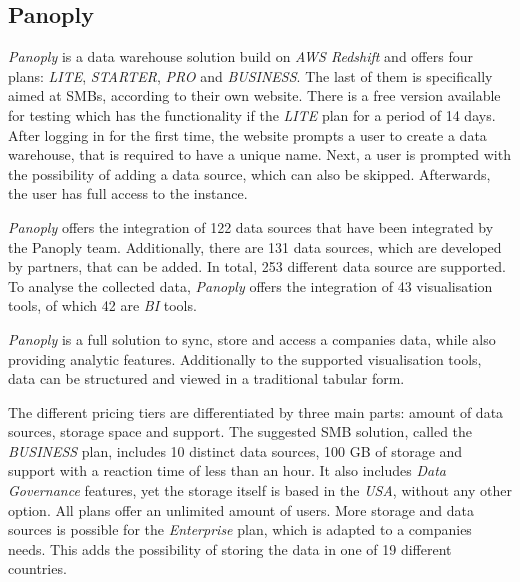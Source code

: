 \documentclass[../paper.tex]{subfiles}
\begin{document}
\subsection{Panoply}

\textit{Panoply} is a data warehouse solution build on \textit{AWS Redshift} and offers four plans: \textit{LITE}, \textit{STARTER}, \textit{PRO} and \textit{BUSINESS}. The last of them is specifically aimed at SMBs, according to their own website. There is a free version available for testing which has the functionality if the \textit{LITE} plan for a period of 14 days. After logging in for the first time, the website prompts a user to create a data warehouse, that is required to have a unique name. Next, a user is prompted with the possibility of adding a data source, which can also be skipped. Afterwards, the user has full access to the instance.

\textit{Panoply} offers the integration of 122 data sources that have been integrated by the Panoply team. Additionally, there are 131 data sources, which are developed by partners, that can be added. In total, 253 different data source are supported. To analyse the collected data, \textit{Panoply} offers the integration of 43 visualisation tools, of which 42 are \textit{BI} tools.

\textit{Panoply} is a full solution to sync, store and access a companies data, while also providing analytic features. Additionally to the supported visualisation tools, data can be structured and viewed in a traditional tabular form.

The different pricing tiers are differentiated by three main parts: amount of data sources, storage space and support. The suggested SMB solution, called the \textit{BUSINESS} plan, includes 10 distinct data sources, 100 GB of storage and support with a reaction time of less than an hour. It also includes \textit{Data Governance} features, yet the storage itself is based in the \textit{USA}, without any other option. All plans offer an unlimited amount of users. More storage and data sources is possible for the \textit{Enterprise} plan, which is adapted to a companies needs. This adds the possibility of storing the data in one of 19 different countries.
\end{document}

